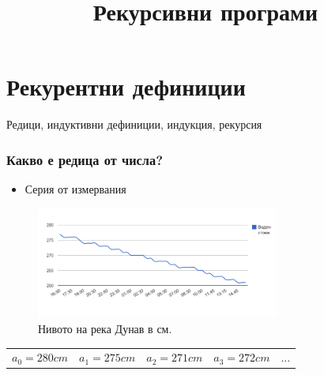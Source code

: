 \documentclass{beamer}
\begin{document}
\title[Увод в програмирането]{Рекурсивни програми} 
\frame{\titlepage} 


\section{Рекурентни дефиниции}

\begin{frame}
\centerline{Редици, индуктивни дефиниции, индукция, рекурсия}
\end{frame}


\begin{frame}[fragile]
\frametitle{Какво е редица от числа?}

\begin{itemize}
  \item Серия от измервания 
\end{itemize}



\begin{figure}[]
  \centering
  \includegraphics[width=8cm]{images/danube}   
  \caption{Нивото на река Дунав в см.}
\end{figure}


\begin{flushleft}
\begin{tabular}{|c|c|c|c|c}
$a_0=280cm$ & $a_1=275cm$ & $a_2=271cm$ & $a_3=272cm$ & ...
\end{tabular}
  
\end{flushleft}


\end{frame}
\end{document}
